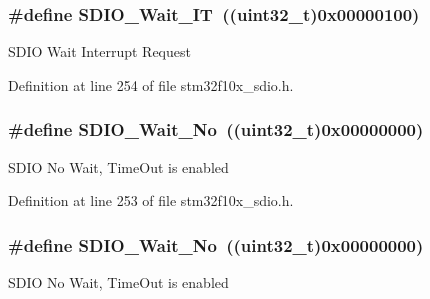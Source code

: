 \subsubsection[{\texorpdfstring{S\+D\+I\+O\+\_\+\+Wait\+\_\+\+IT}{SDIO_Wait_IT}}]{\setlength{\rightskip}{0pt plus 5cm}\#define S\+D\+I\+O\+\_\+\+Wait\+\_\+\+IT~(({\bf uint32\+\_\+t})0x00000100)}\hypertarget{group___s_d_i_o___wait___interrupt___state_ga3914bbe26a656c8e151272ccdc12c71c}{}\label{group___s_d_i_o___wait___interrupt___state_ga3914bbe26a656c8e151272ccdc12c71c}
S\+D\+IO Wait Interrupt Request 

Definition at line 254 of file stm32f10x\+\_\+sdio.\+h.

\subsubsection[{\texorpdfstring{S\+D\+I\+O\+\_\+\+Wait\+\_\+\+No}{SDIO_Wait_No}}]{\setlength{\rightskip}{0pt plus 5cm}\#define S\+D\+I\+O\+\_\+\+Wait\+\_\+\+No~(({\bf uint32\+\_\+t})0x00000000)}\hypertarget{group___s_d_i_o___wait___interrupt___state_ga266294e1ffd7a4b45e62bff753ca44b2}{}\label{group___s_d_i_o___wait___interrupt___state_ga266294e1ffd7a4b45e62bff753ca44b2}
S\+D\+IO No Wait, Time\+Out is enabled 

Definition at line 253 of file stm32f10x\+\_\+sdio.\+h.

\subsubsection[{\texorpdfstring{S\+D\+I\+O\+\_\+\+Wait\+\_\+\+No}{SDIO_Wait_No}}]{\setlength{\rightskip}{0pt plus 5cm}\#define S\+D\+I\+O\+\_\+\+Wait\+\_\+\+No~(({\bf uint32\+\_\+t})0x00000000)}\hypertarget{group___s_d_i_o___wait___interrupt___state_ga266294e1ffd7a4b45e62bff753ca44b2}{}\label{group___s_d_i_o___wait___interrupt___state_ga266294e1ffd7a4b45e62bff753ca44b2}
S\+D\+IO No Wait, Time\+Out is enabled 

